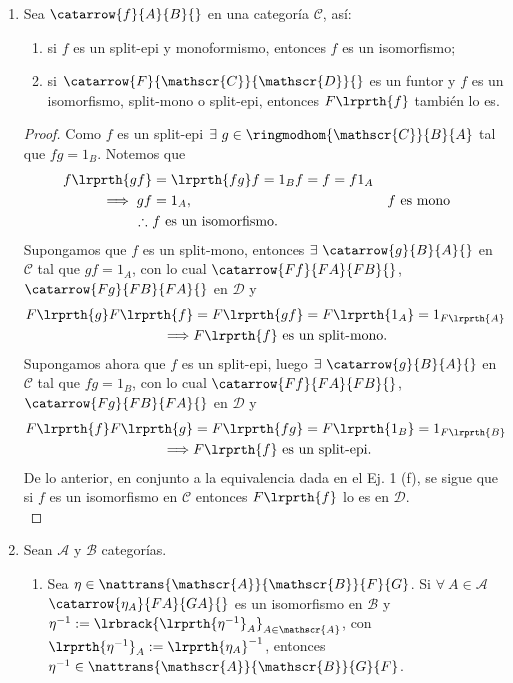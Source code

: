 \documentclass{article}
\begin{document}
\begin{enumerate}[label=\textbf{Ej \arabic*.}]
		\item Sea $\catarrow{f}{A}{B}{}$ en una categoría $\mathscr{C}$, así:
		\begin{enumerate}
			\item si $f$ es un split-epi y monoformismo, entonces $f$ es un isomorfismo;
			\item si $\catarrow{F}{\mathscr{C}}{\mathscr{D}}{}$ es un funtor y $f$ es un isomorfismo, split-mono o split-epi, entonces $F\lrprth{f}$ también lo es.
		\end{enumerate}
		\begin{proof}
			 Como $f$ es un split-epi $\exists\ g\in\ringmodhom{\mathscr{C}}{B}{A}$ tal que $fg=1_B$. Notemos que
			\begin{align*}
				f\lrprth{gf}&=\lrprth{fg}f=1_B f=f=f1_A\\
				\implies gf&=1_A, && f\text{ es mono}\\
				\therefore\ & f \text{ es un isomorfismo.}
			\end{align*}
			 Supongamos que $f$ es un split-mono, entonces $\exists\ \catarrow{g}{B}{A}{}$ en $\mathscr{C}$ tal que $gf=1_A$, con lo cual $\catarrow{Ff}{FA}{FB}{}$, $\catarrow{Fg}{FB}{FA}{}$ en $\mathscr{D}$ y
			\begin{align*}
				F\lrprth{g}F\lrprth{f}&=F\lrprth{gf}=F\lrprth{1_A}=1_{F\lrprth{A}}\\
				\implies & F\lrprth{f}\text{ es un split-mono.}
			\end{align*}
			Supongamos ahora que $f$ es un split-epi, luego $\exists\ \catarrow{g}{B}{A}{}$ en $\mathscr{C}$ tal que $fg=1_B$, con lo cual $\catarrow{Ff}{FA}{FB}{}$, $\catarrow{Fg}{FB}{FA}{}$ en $\mathscr{D}$ y
			\begin{align*}
				F\lrprth{f}F\lrprth{g}&=F\lrprth{fg}=F\lrprth{1_B}=1_{F\lrprth{B}}\\
				\implies & F\lrprth{f}\text{ es un split-epi.}
			\end{align*}   
			De lo anterior, en conjunto a la equivalencia dada en el Ej. 1 (f), se sigue que si $f$ es un isomorfismo en $\mathscr{C}$ entonces $F\lrprth{f}$ lo es en $\mathscr{D}$.\\
		\end{proof}
		\item Sean $\mathscr{A}$ y $\mathscr{B}$ categorías.
		\begin{enumerate}
			\item Sea $\eta\in\nattrans{\mathscr{A}}{\mathscr{B}}{F}{G}$. Si $\forall\ A\in\mathscr{A}$ $\catarrow{\eta_{A}}{FA}{GA}{}$ es un isomorfismo en $\mathscr{B}$ y $\eta^{-1}:=\lrbrack{\lrprth{\eta^{-1}}_A}_{A\in\mathscr{A}}$, con $\lrprth{\eta^{-1}}_A:=\lrprth{\eta_{A}}^{-1}$, entonces $\eta^{-1}\in\nattrans{\mathscr{A}}{\mathscr{B}}{G}{F}$.

\end{enumerate}
\end{enumerate}
\end{document}
